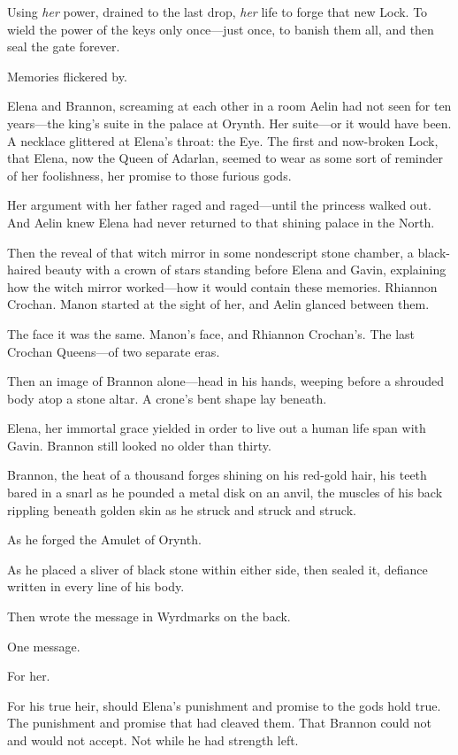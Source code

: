 Using \emph{her} power, drained to the last drop, \emph{her} life to forge that new Lock. To wield the power of the keys only once---just once, to banish them all, and then seal the gate forever.

Memories flickered by.

Elena and Brannon, screaming at each other in a room Aelin had not seen for ten years---the king's suite in the palace at Orynth. Her suite---or it would have been. A necklace glittered at Elena's throat: the Eye. The first and now-broken Lock, that Elena, now the Queen of Adarlan, seemed to wear as some sort of reminder of her foolishness, her promise to those furious gods.

Her argument with her father raged and raged---until the princess walked out. And Aelin knew Elena had never returned to that shining palace in the North.

Then the reveal of that witch mirror in some nondescript stone chamber, a black-haired beauty with a crown of stars standing before Elena and Gavin, explaining how the witch mirror worked---how it would contain these memories. Rhiannon Crochan. Manon started at the sight of her, and Aelin glanced between them.

The face  it was the same. Manon's face, and Rhiannon Crochan's. The last Crochan Queens---of two separate eras.

Then an image of Brannon alone---head in his hands, weeping before a shrouded body atop a stone altar. A crone's bent shape lay beneath.

Elena, her immortal grace yielded in order to live out a human life span with Gavin. Brannon still looked no older than thirty.

Brannon, the heat of a thousand forges shining on his red-gold hair, his teeth bared in a snarl as he pounded a metal disk on an anvil, the muscles of his back rippling beneath golden skin as he struck and struck and struck.

As he forged the Amulet of Orynth.

As he placed a sliver of black stone within either side, then sealed it, defiance written in every line of his body.

Then wrote the message in Wyrdmarks on the back.

One message.

For her.

For his true heir, should Elena's punishment and promise to the gods hold true. The punishment and promise that had cleaved them. That Brannon could not and would not accept. Not while he had strength left.

